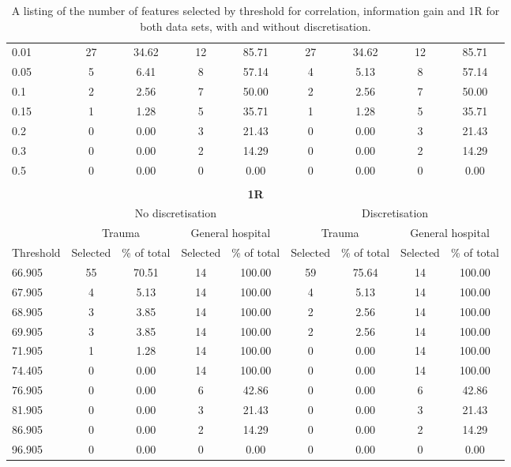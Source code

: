\begin{table}[htbp]
{\begin{tabular}{lcccccccc}
     0.01 & 27 & 34.62 & 12 & 85.71 & 27 & 34.62 & 12 & 85.71 \\
     0.05 & 5 & 6.41 & 8 & 57.14 & 4 & 5.13 & 8 & 57.14 \\
     0.1 & 2 & 2.56 & 7 & 50.00 & 2 & 2.56 & 7 & 50.00 \\
     0.15 & 1 & 1.28 & 5 & 35.71 & 1 & 1.28 & 5 & 35.71 \\
     0.2 & 0 & 0.00 & 3 & 21.43 & 0 & 0.00 & 3 & 21.43 \\
     0.3 & 0 & 0.00 & 2 & 14.29 & 0 & 0.00 & 2 & 14.29 \\
     0.5 & 0 & 0.00 & 0 & 0.00 & 0 & 0.00 & 0 & 0.00 \\
      &  &  &  &  &  &  &  &  \\
      \multicolumn{9}{c}{\textbf{1R}} \\
       & \multicolumn{4}{c}{No discretisation} & \multicolumn{4}{c}{Discretisation} \\
       \hline
        & \multicolumn{2}{c}{Trauma} & \multicolumn{2}{c}{General hospital} & \multicolumn{2}{c}{Trauma} & \multicolumn{2}{c}{General hospital} \\
        Threshold & Selected & \% of total & Selected & \% of total & Selected & \% of total & Selected & \% of total \\
        \hline
        66.905 & 55 & 70.51 & 14 & 100.00 & 59 & 75.64 & 14 & 100.00 \\
        67.905 & 4 & 5.13 & 14 & 100.00 & 4 & 5.13 & 14 & 100.00 \\
        68.905 & 3 & 3.85 & 14 & 100.00 & 2 & 2.56 & 14 & 100.00 \\
        69.905 & 3 & 3.85 & 14 & 100.00 & 2 & 2.56 & 14 & 100.00 \\
        71.905 & 1 & 1.28 & 14 & 100.00 & 0 & 0.00 & 14 & 100.00 \\
        74.405 & 0 & 0.00 & 14 & 100.00 & 0 & 0.00 & 14 & 100.00 \\
        76.905 & 0 & 0.00 & 6 & 42.86 & 0 & 0.00 & 6 & 42.86 \\
        81.905 & 0 & 0.00 & 3 & 21.43 & 0 & 0.00 & 3 & 21.43 \\
        86.905 & 0 & 0.00 & 2 & 14.29 & 0 & 0.00 & 2 & 14.29 \\
        96.905 & 0 & 0.00 & 0 & 0.00 & 0 & 0.00 & 0 & 0.00
        \end{tabular}
}
\caption{A listing of the number of features selected by threshold for correlation, information gain and 1R for both data sets, with and without discretisation.}
\label{tab:features-selected-threshold}
\end{table}
